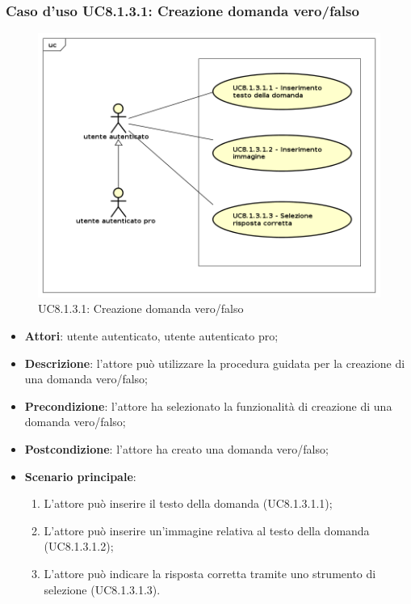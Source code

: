 \subsubsection{Caso d'uso UC8.1.3.1: Creazione domanda vero/falso}
	\label{UC8.1.3.1}
	\begin{figure}[h]
		\centering
			\includegraphics[scale=0.45,keepaspectratio]{UML/UC8_1_3_1.png}
		\caption{UC8.1.3.1: Creazione domanda vero/falso}
	\end{figure}
	\FloatBarrier
	\begin{itemize}
		\item
			\textbf{Attori}: utente autenticato, utente autenticato pro;
		\item		
			\textbf{Descrizione}: l'attore può utilizzare la procedura guidata per la creazione di una domanda vero/falso;
		\item
			\textbf{Precondizione}: l'attore ha selezionato la funzionalità di creazione di una domanda vero/falso; 
		\item
			\textbf{Postcondizione}: l'attore ha creato una domanda vero/falso;
		\item
			\textbf{Scenario principale}:
	       		\begin{enumerate}
	       			\item
	       			L'attore può inserire il testo della domanda (UC8.1.3.1.1);
	       			\item
	       			L'attore può inserire un'immagine relativa al testo della domanda (UC8.1.3.1.2);
					\item
					L'attore può indicare la risposta corretta tramite uno strumento di selezione (UC8.1.3.1.3).
	 			\end{enumerate}
	\end{itemize}

